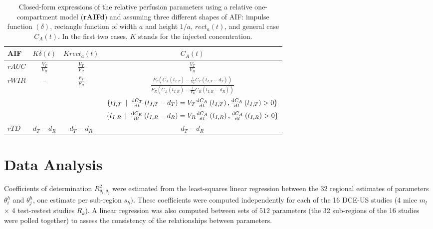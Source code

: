 \begin{table}[!h]
\begin{center}
\begin{tabular}{lccc}
\toprule
AIF & \textbf{$K\delta\left(t\right)$} & $K rect_a\left(t\right)$ & $C_A \left(t\right)$ \\
\midrule
\textbf{$rAUC$} & $\frac{V_T}{V_R}$ & $\frac{V_T}{V_R}$ & $\frac{V_T}{V_R}$\\
\midrule
\multirow{3}{*}{\textbf{$rWIR$}} &  \multirow{3}{*}{--} & \multirow{3}{*}{{$\frac{F_T}{F_R}$}} & $\frac{F_T\left(C_A\left(t_{I,T}\right)-\frac{1}{V_T}C_T\left(t_{I,T} - d_T\right)\right)}{F_R\left(C_A\left(t_{I,R}\right)-\frac{1}{V_R}C_R\left(t_{I,R} - d_R\right)\right)}$ \\
&  & & $\{ t_{I,T} \enskip\vert\enskip \frac{\mathrm d C_T}{\mathrm dt}\left(t_{I,T} - d_T\right) = V_T \frac{\mathrm d C_A}{\mathrm dt}\left(t_{I,T}\right), \frac{\mathrm d C_A}{\mathrm d t}\left(t_{I,T}\right) > 0\}$ \\
&  & & $\{ t_{I,R} \enskip\vert\enskip \frac{\mathrm d C_R}{\mathrm dt}\left(t_{I,R} - d_R\right) = V_R \frac{\mathrm d C_A}{\mathrm dt}\left(t_{I,R}\right), \frac{\mathrm d C_A}{\mathrm d t}\left(t_{I,R}\right) > 0\}$ \\
\midrule
$rTD$ & $d_T - d_R$ & $d_T - d_R$ & $d_T - d_R$ \\
\bottomrule
\end{tabular}
\caption{Closed-form expressions of the relative perfusion parameters using a relative one-compartment model (\textbf{rAIFd}) and assuming three different shapes of AIF: impulse  function $(\delta)$, rectangle function of width $a$ and height $1/a$, $rect_a(t)$, and general case $C_A(t)$. In the first two cases, $K$ stands for the injected concentration.}
\label{tab:AnalyticRelationRelative}
\end{center}
\end{table}

\section{Data Analysis}
Coefficients of determination $R^2_{\theta_{i},\theta_{j}}$ were estimated from the least-squares linear regression between the 32 regional estimates of parameters $\theta_{i}^{h}$ and $\theta_{j}^{h}$, one estimate per sub-region $s_{h})$. These coefficients were computed independently for each of the 16 DCE-US studies (4 mice $m_{l}$ $\times$ 4 test-restest studies $R_{k}$). A linear regression was also computed between sets of $512$ parameters (the 32 sub-regions of the 16 studies were polled together) to assess the consistency of the relationships between parameters. 

